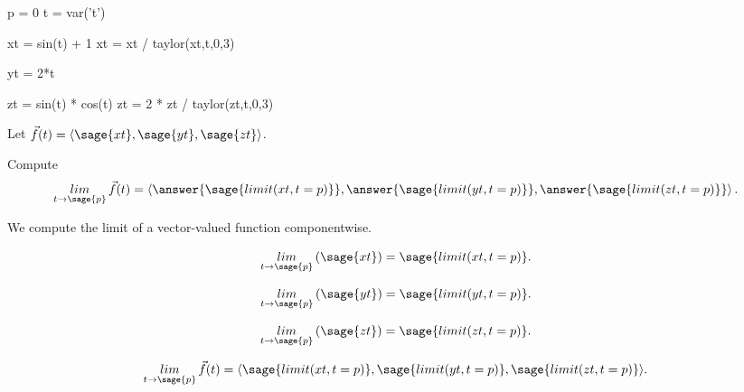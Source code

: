 \documentclass{ximera}
\author{Jim Fowler}
\begin{document}
\makerandom

\begin{sagesilent}
  p = 0
  t = var('t')
  
  xt = sin(t) + 1
  xt = xt / taylor(xt,t,0,3)
  
  yt = 2*t
  
  zt = sin(t) * cos(t)
  zt = 2 * zt / taylor(zt,t,0,3)
\end{sagesilent}

\begin{exercise}

  Let $\vec{f}(t) = \langle \sage{xt}, \sage{yt}, \sage{zt} \rangle$.

  Compute
  \[
    \mathop{lim}_{t \to \sage{p}} \vec{f}(t) =
    \left\langle \answer{\sage{limit(xt,t=p)}}, \answer{\sage{limit(yt,t=p)}}, \answer{\sage{limit(zt,t=p)}} \right\rangle.
  \]
  
  \begin{hint}
    We compute the limit of a vector-valued function componentwise.
  \end{hint}

  \begin{hint}
    \[\mathop{lim}_{t \to \sage{p}} \left( \sage{xt} \right) = \sage{limit(xt,t=p)}.\]
  \end{hint}

  \begin{hint}
    \[\mathop{lim}_{t \to \sage{p}} \left( \sage{yt} \right) = \sage{limit(yt,t=p)}.\]
  \end{hint}

  \begin{hint}
    \[\mathop{lim}_{t \to \sage{p}} \left( \sage{zt} \right) = \sage{limit(zt,t=p)}.\]
  \end{hint}
  
  \begin{hint}
    \[\mathop{lim}_{t \to \sage{p}} \vec{f}(t) = \langle \sage{limit(xt,t=p)}, \sage{limit(yt,t=p)}, \sage{limit(zt,t=p)} \rangle.\]
  \end{hint}          
  
\end{exercise}
\end{document}
